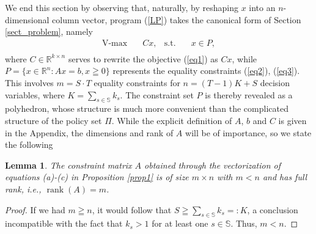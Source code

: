 \documentclass{article}
\newtheorem{lemma}[theorem]{Lemma}
\theoremstyle{definition}
\numberwithin{equation}{section}
\DeclareMathOperator{\rank}{rank}
\begin{document}
{We end this section by observing that, naturally, by reshaping $x$ into an $n$-dimensional column vector,
program
(\ref{LP}) takes 
the canonical form of Section \ref{sect_problem}, namely
\begin{equation*}
\begin{aligned}
\operatorname{V-max} \quad & Cx, & \textrm{s.t.} \quad & x \in P,\\
\end{aligned}
\end{equation*} 
where 
$C \in \mathbb{R}^{k \times n}$ serves to rewrite
the objective (\ref{eq1}) as $Cx$, while $P=\{x\in \mathbb R^n: Ax=b, x\geqq 0\}$ represents
the equality constraints (\ref{eq2}), (\ref{eq3}).  
This involves  $m = S\cdot T$ equality constraints
for $n = (T-1)K + S$ decision variables, where $K=\sum_{s\in \mathbb{S}} k_s$. 
The constraint set
$P$ %
is thereby revealed
as a polyhedron,   whose structure is much more convenient than the
complicated structure of the policy set $\Pi$.
While the explicit definition of $A$, $b$ and $C$ is given in the Appendix, the dimensions and rank of $A$ will be of importance, so we state the following

\begin{lemma}
\label{A_rank}
The constraint matrix $A$ obtained through the vectorization of equations {\rm (a)-(c)} in Proposition
{\rm \ref{prop1}} is of size $m \times n$
with $m < n$ and has full rank, i.e., $\rank(A) = m$.
\end{lemma}

\begin{proof}
If we had $m \geqq n$, it would follow that $S \geqq \sum_{s \in \mathbb{S}}k_s =: K$, a conclusion incompatible with the fact that $k_s > 1$ for at least one $s \in \mathbb{S}$. Thus, $m < n$.


\end{proof}}
\end{document}
